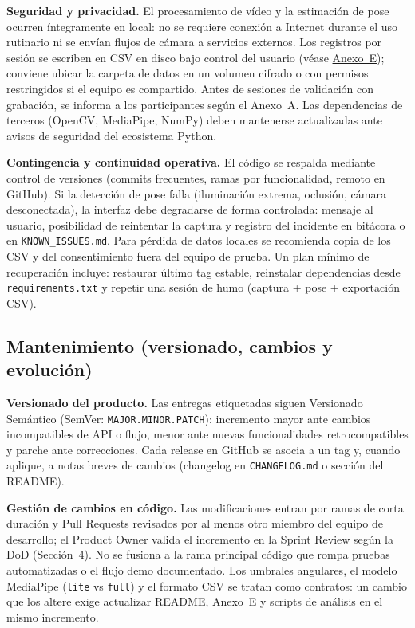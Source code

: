 \documentclass[11pt,a4paper]{article}
\begin{document}
\textbf{Seguridad y privacidad.} El procesamiento de vídeo y la estimación de pose ocurren íntegramente en local: no se requiere conexión a Internet durante el uso rutinario ni se envían flujos de cámara a servicios externos. Los registros por sesión se escriben en CSV en disco bajo control del usuario (véase \hyperref[anexo:csv-sesion]{Anexo~E}); conviene ubicar la carpeta de datos en un volumen cifrado o con permisos restringidos si el equipo es compartido. Antes de sesiones de validación con grabación, se informa a los participantes según el Anexo~A. Las dependencias de terceros (OpenCV, MediaPipe, NumPy) deben mantenerse actualizadas ante avisos de seguridad del ecosistema Python.

\textbf{Contingencia y continuidad operativa.} El código se respalda mediante control de versiones (commits frecuentes, ramas por funcionalidad, remoto en GitHub). Si la detección de pose falla (iluminación extrema, oclusión, cámara desconectada), la interfaz debe degradarse de forma controlada: mensaje al usuario, posibilidad de reintentar la captura y registro del incidente en bitácora o en \texttt{KNOWN\_ISSUES.md}. Para pérdida de datos locales se recomienda copia de los CSV y del consentimiento fuera del equipo de prueba. Un plan mínimo de recuperación incluye: restaurar último tag estable, reinstalar dependencias desde \texttt{requirements.txt} y repetir una sesión de humo (captura + pose + exportación CSV).

\subsection{Mantenimiento (versionado, cambios y evolución)}
\textbf{Versionado del producto.} Las entregas etiquetadas siguen Versionado Semántico (SemVer: \texttt{MAJOR.MINOR.PATCH}): incremento mayor ante cambios incompatibles de API o flujo, menor ante nuevas funcionalidades retrocompatibles y parche ante correcciones. Cada release en GitHub se asocia a un tag y, cuando aplique, a notas breves de cambios (changelog en \texttt{CHANGELOG.md} o sección del README).

\textbf{Gestión de cambios en código.} Las modificaciones entran por ramas de corta duración y Pull Requests revisados por al menos otro miembro del equipo de desarrollo; el Product Owner valida el incremento en la Sprint Review según la DoD (Sección~4). No se fusiona a la rama principal código que rompa pruebas automatizadas o el flujo demo documentado. Los umbrales angulares, el modelo MediaPipe (\texttt{lite} vs \texttt{full}) y el formato CSV se tratan como contratos: un cambio que los altere exige actualizar README, Anexo~E y scripts de análisis en el mismo incremento.
\end{document}
